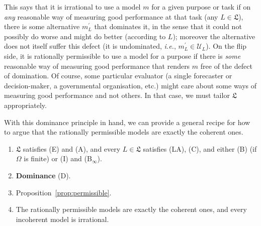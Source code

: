 \documentclass[11pt]{article}
\theoremstyle{definition}
\theoremstyle{remark}
\newcommand{\U}{\mathcal U}
\begin{document}
This says that it is irrational to use a model $m$ for a given purpose or task if on \textit{any} reasonable way of measuring good performance at that task (any $L\in\mathfrak L$), there is some alternative $m_L^\prime$ that dominates it, in the sense that it could not possibly do worse and might do better (according to $L$); moreover the alternative does not itself suffer this defect (it is undominated, \textit{i.e.}, $m_L^\prime\in\U_L$). On the flip side, it is rationally permissible to use a model for a purpose if there is \textit{some} reasonable way of measuring good performance that renders $m$ free of the defect of domination. Of course, some particular evaluator (a single forecaster or decision-maker, a governmental organisation, etc.) might care about some ways of measuring good performance and not others. In that case, we must tailor $\mathfrak L$ appropriately.

With this dominance principle in hand, we can provide a general recipe for how to argue that the rationally permissible models are exactly the coherent ones.
\begin{enumerate}[label=\textbf{(P\arabic*)},leftmargin=*]
\item $\mathfrak L$ satisfies (E) and (A), and every $L\in\mathfrak L$ satisfies (LA), (C), and either (B) (if $\Omega$ is finite) or (I) and (B$_\infty$).
\item \textbf{Dominance} (D).
\item Proposition~\ref{prop:permissible}.
\item[\textbf{(P4)}] The rationally permissible models are exactly the coherent ones, and every incoherent model is irrational.
\end{enumerate}
\end{document}
